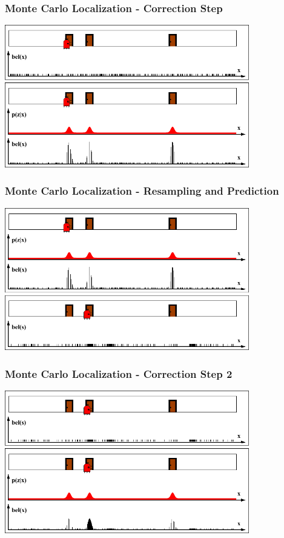 \begin{frame}
    \frametitle{Monte Carlo Localization - Correction Step}
    \begin{center}
        \includegraphics[width=0.8\textwidth]{./images/particle_filter/monte_carlo_correction.pdf}
    \end{center}
\end{frame}

\begin{frame}
    \frametitle{Monte Carlo Localization - Resampling and Prediction}
    \begin{center}
        \includegraphics[width=0.8\textwidth]{./images/particle_filter/monte_carlo_resample_and_predict.pdf}
    \end{center}
\end{frame}

\begin{frame}
    \frametitle{Monte Carlo Localization - Correction Step 2}
    \begin{center}
        \includegraphics[width=0.8\textwidth]{./images/particle_filter/monte_carlo_correction2.pdf}
    \end{center}
\end{frame}

